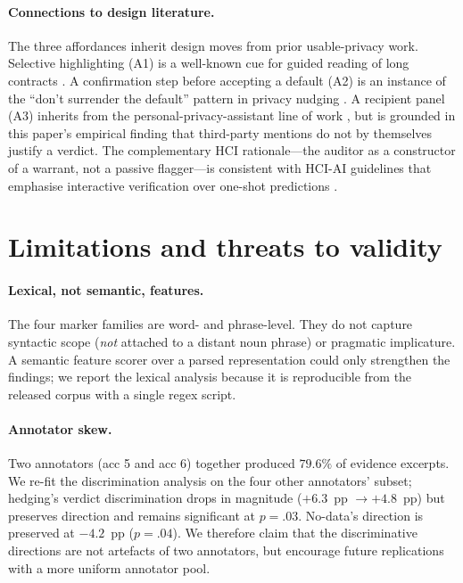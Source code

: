 \documentclass[11pt,a4paper]{article}
\newcommand{\dec}[1]{\textsf{#1}}
\begin{document}
\paragraph{Connections to design literature.}
The three affordances inherit design moves from prior usable-privacy
work. Selective highlighting (A1) is a well-known cue for guided
reading of long contracts \citep{schaub2015design,kelley2009nutrition}.
A confirmation step before accepting a default (A2) is an instance of
the ``don't surrender the default'' pattern in privacy nudging
\citep{almuhimedi2015your,liao2020questioning}. A recipient panel
(A3) inherits from the personal-privacy-assistant line of work
\citep{liu2016follow,lin2014modeling}, but is grounded in this
paper's empirical finding that third-party mentions do not by
themselves justify a verdict. The complementary HCI rationale---the
auditor as a constructor of a warrant, not a passive flagger---is
consistent with HCI-AI guidelines that emphasise interactive
verification over one-shot predictions
\citep{amershi2019guidelines,bansal2021does,cai2019hello}.

\section{Limitations and threats to validity}\label{sec:threats}

\paragraph{Lexical, not semantic, features.}
The four marker families are word- and phrase-level. They do not
capture syntactic scope (\emph{not} attached to a distant noun phrase)
or pragmatic implicature. A semantic feature scorer over a parsed
representation could only strengthen the findings; we report the
lexical analysis because it is reproducible from the released corpus
with a single regex script.

\paragraph{Annotator skew.}
Two annotators (\dec{acc 5} and \dec{acc 6}) together produced
$79.6\%$ of evidence excerpts. We re-fit the discrimination analysis
on the four other annotators' subset; hedging's verdict
discrimination drops in magnitude ($+6.3$~pp $\to +4.8$~pp) but
preserves direction and remains significant at $p=.03$. No-data's
direction is preserved at $-4.2$~pp ($p=.04$). We therefore claim
that the discriminative directions are not artefacts of two
annotators, but encourage future replications with a more uniform
annotator pool.
\end{document}
